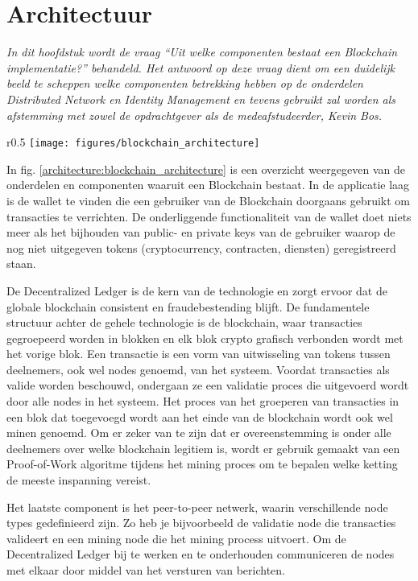 \section{Architectuur}
\label{chapter:architecture}

\textit{
  In dit hoofdstuk wordt de vraag ``Uit welke componenten bestaat een Blockchain implementatie?'' behandeld. Het antwoord op deze vraag dient om een duidelijk beeld te scheppen welke componenten betrekking hebben op de onderdelen Distributed Network en Identity Management en tevens gebruikt zal worden als afstemming met zowel de opdrachtgever als de medeafstudeerder, Kevin Bos. 
}

\begin{wrapfigure}{r}{0.5\textwidth}
  \texttt{[image: figures/blockchain\_architecture]}
  \caption{Blockchain architectuur}
  \label{architecture:blockchain_architecture}
\end{wrapfigure}

In fig. \ref{architecture:blockchain_architecture} is een overzicht weergegeven van de onderdelen en componenten waaruit een Blockchain bestaat. In de applicatie laag is de wallet te vinden die een gebruiker van de Blockchain doorgaans gebruikt om transacties te verrichten. De onderliggende functionaliteit van de wallet doet niets meer als het bijhouden van public- en private keys van de gebruiker waarop de nog niet uitgegeven tokens (cryptocurrency, contracten, diensten) geregistreerd staan.

De Decentralized Ledger is de kern van de technologie en zorgt ervoor dat de globale blockchain consistent en fraudebestending blijft. De fundamentele structuur achter de gehele technologie is de blockchain, waar transacties gegroepeerd worden in blokken en elk blok crypto grafisch verbonden wordt met het vorige blok. Een transactie is een vorm van uitwisseling van tokens tussen deelnemers, ook wel nodes genoemd, van het systeem. Voordat transacties als valide worden beschouwd, ondergaan ze een validatie proces die uitgevoerd wordt door alle nodes in het systeem. Het proces van het groeperen van transacties in een blok dat toegevoegd wordt aan het einde van de blockchain wordt ook wel minen genoemd. Om er zeker van te zijn dat er overeenstemming is onder alle deelnemers over welke blockchain legitiem is, wordt er gebruik gemaakt van een Proof-of-Work algoritme tijdens het mining proces om te bepalen welke ketting de meeste inspanning vereist.

Het laatste component is het peer-to-peer netwerk, waarin verschillende node types gedefinieerd zijn. Zo heb je bijvoorbeeld de validatie node die transacties valideert en een mining node die het mining process uitvoert. Om de Decentralized Ledger bij te werken en te onderhouden communiceren de nodes met elkaar door middel van het versturen van berichten.